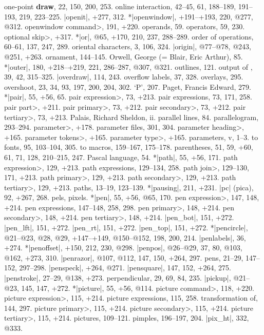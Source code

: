 one-point {\bf draw}, 22, 150, 200, 253.
online interaction, 42--45, 61, 188--189, 191--193, 219, 223--225.
|openit|, +277, 312.
*|openwindow|, +191--+193, 220, @277, @312.
\<openwindow command>, 191, +220.
operands, 59.
operators, 59, 230.
\<optional skip>, +317.
*|or|, @65, +170, 210, 237, 288--289.
order of operations, 60--61, 137, 247, 289.
oriental characters, 3, 106, 324.
|origin|, @77--@78, @243, @251, +263.
ornament, 144--145.
Orwell, George (= Blair, Eric Arthur), 85.
*|outer|, 180, +218--+219, 221, 286--287, @307, @321.
outlines, 121.
output of \MF, 39, 42, 315--325.
|overdraw|, 114, 243.
overflow labels, 37, 328.
overlays, 295.
overshoot, 23, 34, 93, 197, 200, 204, 302.
\newletter
`P', 207.
Paget, Francis Edward, 279.
*|pair|, 55, +56, 65.
\<pair expression>, 73, +213.
pair expressions, 73, 171, 258.
\<pair part>, +211.
\<pair primary>, 73, +212.
\<pair secondary>, 73, +212.
\<pair tertiary>, 73, +213.
Palais, Richard Sheldon, ii.
parallel lines, 84.
parallelogram, 293--294.
\<parameter>, +178.
parameter files, 301, 304.
\<parameter heading>, +165.
\<parameter tokens>, +165.
\<parameter type>, +165.
parameters, v, 1--3.
\sub to fonts, 95, 103--104, 305.
\sub to macros, 159--167, 175--178.
parentheses, 51, 59, +60, 61, 71, 128, 210--215, 247.
Pascal language, 54.
*|path|, 55, +56, 171.
\<path expression>, 129, +213.
path expressions, 129--134, 258.
\<path join>, 129--130, 171, +213.
\<path primary>, 129, +213.
\<path secondary>, 129, +213.
\<path tertiary>, 129, +213.
paths, 13--19, 123--139.
*|pausing|, 211, +231.
|pc| (pica), 92, +267, 268.
pels, \see pixels.
*|pen|, 55, +56, @65, 170.
\<pen expression>, 147, 148, +214.
pen expressions, 147--148, 258, 298.
\<pen primary>, 148, +214.
\<pen secondary>, 148, +214.
\<pen tertiary>, 148, +214.
|pen_bot|, 151, +272.
|pen_lft|, 151, +272.
|pen_rt|, 151, +272.
|pen_top|, 151, +272.
*|pencircle|, @21--@23, @28, @29, +147--+149, @150--@152, 198, 200, 214.
|penlabels|, 36, +274.
*|penoffset|, +150, 212, 230, @298.
|penpos|, @26--@29, 37, 80, @103, @162, +273, 310.
|penrazor|, @107, @112, 147, 150, +264, 297.
pens, 21--29, 147--152, 297--298.
|penspeck|, +264, @271.
|pensquare|, 147, 152, +264, 275.
|penstroke|, 27--29, @138, +273.
perpendicular, 29, 69, 84, 235.
|pickup|, @21--@23, 145, 147, +272.
*|picture|, 55, +56, @114.
\<picture command>, 118, +220.
\<picture expression>, 115, +214.
picture expressions, 115, 258.
\sub transformation of, 144, 297.
\<picture primary>, 115, +214.
\<picture secondary>, 115, +214.
\<picture tertiary>, 115, +214.
pictures, 109--121.
pimples, 196--197, 204.
|pix_ht|, 332, @333.
